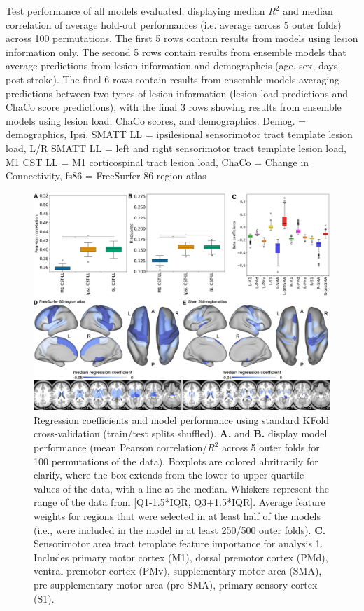 \documentclass[10pt]{article}
\begin{document}
\begin{table}
\caption{Test performance of all models evaluated, displaying median $R^2$ and median correlation of average hold-out performances (i.e. average across 5 outer folds) across 100 permutations. The first 5 rows contain results from models using lesion information only. The second 5 rows contain results from ensemble models that average predictions from lesion information and demographcis (age, sex, days post stroke). The final 6 rows contain results from ensemble models averaging predictions between two types of lesion information (lesion load predictions and ChaCo score predictions), with the final 3 rows showing results from ensemble models using lesion load, ChaCo scores, and demographics. Demog. = demographics, Ipsi. SMATT LL = ipsilesional sensorimotor tract template lesion load, L/R SMATT LL = left and right sensorimotor tract template lesion load, M1 CST LL = M1 corticospinal tract lesion load, ChaCo = Change in Connectivity, fs86 = FreeSurfer 86-region atlas}
\end{table}

\begin{figure}[htp]
\centering
\includegraphics[width=1\linewidth]{figures/Analysis1.png}
\caption{Regression coefficients and model performance using standard KFold cross-validation (train/test splits shuffled). \textbf{A.} and \textbf{B.} display model performance (mean Pearson correlation/$R^2$ across 5 outer folds for 100 permutations of the data). Boxplots are colored abritrarily for clarify, where the box extends from the lower to upper quartile values of the data, with a line at the median. Whiskers represent the range of the data from [Q1-1.5*IQR, Q3+1.5*IQR].
Average feature weights for regions that were selected in at least half of the models (i.e., were included in the model in at least 250/500 outer folds). \textbf{C.} Sensorimotor area tract template feature importance for analysis 1. Includes primary motor cortex (M1), dorsal premotor cortex (PMd), ventral premotor cortex (PMv), supplementary motor area (SMA), pre-supplementary motor area (pre-SMA), primary sensory cortex (S1).}
\label{analysis1}
\end{figure}
\end{document}
